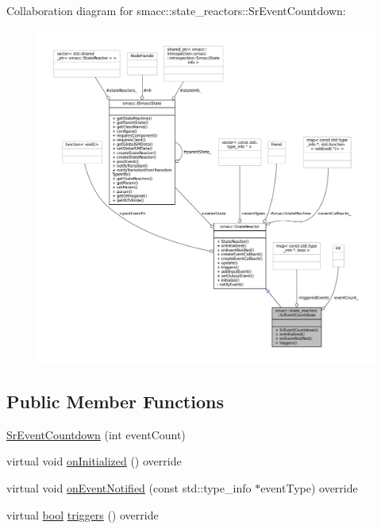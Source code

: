 Collaboration diagram for smacc\+:\+:state\+\_\+reactors\+:\+:Sr\+Event\+Countdown\+:
\nopagebreak
\begin{figure}[H]
\begin{center}
\leavevmode
\includegraphics[width=350pt]{classsmacc_1_1state__reactors_1_1SrEventCountdown__coll__graph}
\end{center}
\end{figure}
\subsection*{Public Member Functions}
\begin{DoxyCompactItemize}
\item 
\hyperlink{classsmacc_1_1state__reactors_1_1SrEventCountdown_abc814e91ad26a46ee5d91e2f19b639b1}{Sr\+Event\+Countdown} (int event\+Count)
\item 
virtual void \hyperlink{classsmacc_1_1state__reactors_1_1SrEventCountdown_a1bd7afbf283ade29f9305f0c3a64ef94}{on\+Initialized} () override
\item 
virtual void \hyperlink{classsmacc_1_1state__reactors_1_1SrEventCountdown_a6cc15cf6633bd882ac40a87d698b3b6b}{on\+Event\+Notified} (const std\+::type\+\_\+info $\ast$event\+Type) override
\item 
virtual \hyperlink{classbool}{bool} \hyperlink{classsmacc_1_1state__reactors_1_1SrEventCountdown_aff678113dbd07339e5e3736e4aa00c81}{triggers} () override
\end{DoxyCompactItemize}
